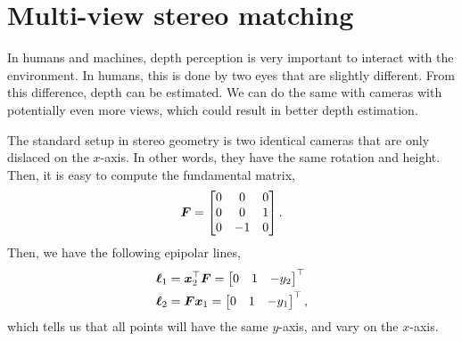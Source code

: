\section{Multi-view stereo matching}

In humans and machines, depth perception is very important to interact with the
environment. In humans, this is done by two eyes that are slightly different.
From this difference, depth can be estimated. We can do the same with cameras
with potentially even more views, which could result in better depth
estimation.


The standard setup in stereo geometry is two identical cameras that are only
dislaced on the $x$-axis. In other words, they have the same rotation and
height. Then, it is easy to compute the fundamental matrix, \[
  \bm{F} = \begin{bmatrix} 0 & 0 & 0 \\ 0 & 0 & 1 \\ 0 & -1 & 0 \end{bmatrix}
.\]
Then, we have the following epipolar lines,
\begin{align*}
  \bm{\ell}_1 &= \bm{x}_2^\top \bm{F} = \begin{bmatrix} 0 & 1 & -y_2 \end{bmatrix}^\top \\
  \bm{\ell}_2 &= \bm{F} \bm{x}_1 = \begin{bmatrix} 0 & 1 & -y_1 \end{bmatrix}^\top
,\end{align*}
which tells us that all points will have the same $y$-axis, and vary on the
$x$-axis.

